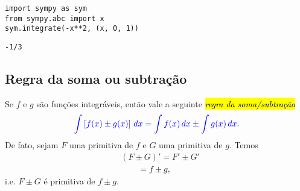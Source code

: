 \begin{ex}
\begin{enumerate}[a)]
\begin{lstlisting}
import sympy as sym
from sympy.abc import x
sym.integrate(-x**2, (x, 0, 1))
\end{lstlisting}

\begin{verbatim}
-1/3
\end{verbatim}

  \end{enumerate}

\end{ex}

\subsection{Regra da soma ou subtração}

Se $f$ e $g$ são funções integráveis, então vale a seguinte \hl{\emph{regra da soma/subtração}}
\begin{equation}\label{cap_int_sec_regrasbasias:eq:regra_soma}\color{blue}\int \left[f(x)\pm g(x)\right]\,dx = \int f(x)\,dx \pm \int g(x)\,dx.
\end{equation}
De fato, sejam $F$ uma primitiva de $f$ e $G$ uma primitiva de $g$. Temos
\begin{align}
  & (F \pm G)' = F' \pm G'\\
  &\text{}\qquad = f \pm g,
\end{align}
i.e. $F \pm G$ é primitiva de $f\pm g$.

